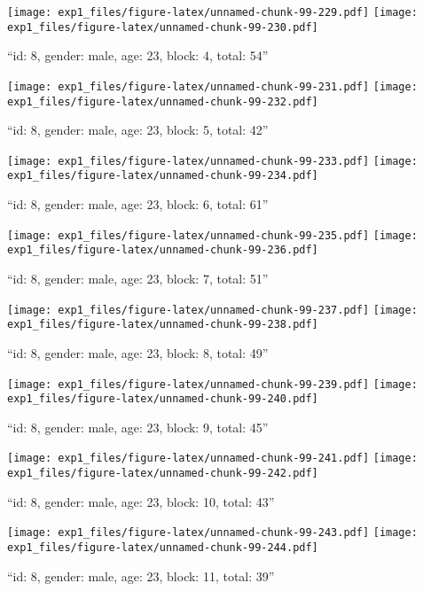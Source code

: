 \documentclass[,]{article}
\begin{document}
\texttt{[image: exp1\_files/figure-latex/unnamed-chunk-99-229.pdf]}
\texttt{[image: exp1\_files/figure-latex/unnamed-chunk-99-230.pdf]}

\newpage
[1] 

``id: 8, gender: male, age: 23, block: 4, total: 54''

\texttt{[image: exp1\_files/figure-latex/unnamed-chunk-99-231.pdf]}
\texttt{[image: exp1\_files/figure-latex/unnamed-chunk-99-232.pdf]}

\newpage
[1] 

``id: 8, gender: male, age: 23, block: 5, total: 42''

\texttt{[image: exp1\_files/figure-latex/unnamed-chunk-99-233.pdf]}
\texttt{[image: exp1\_files/figure-latex/unnamed-chunk-99-234.pdf]}

\newpage
[1] 

``id: 8, gender: male, age: 23, block: 6, total: 61''

\texttt{[image: exp1\_files/figure-latex/unnamed-chunk-99-235.pdf]}
\texttt{[image: exp1\_files/figure-latex/unnamed-chunk-99-236.pdf]}

\newpage
[1] 

``id: 8, gender: male, age: 23, block: 7, total: 51''

\texttt{[image: exp1\_files/figure-latex/unnamed-chunk-99-237.pdf]}
\texttt{[image: exp1\_files/figure-latex/unnamed-chunk-99-238.pdf]}

\newpage
[1] 

``id: 8, gender: male, age: 23, block: 8, total: 49''

\texttt{[image: exp1\_files/figure-latex/unnamed-chunk-99-239.pdf]}
\texttt{[image: exp1\_files/figure-latex/unnamed-chunk-99-240.pdf]}

\newpage
[1] 

``id: 8, gender: male, age: 23, block: 9, total: 45''

\texttt{[image: exp1\_files/figure-latex/unnamed-chunk-99-241.pdf]}
\texttt{[image: exp1\_files/figure-latex/unnamed-chunk-99-242.pdf]}

\newpage
[1] 

``id: 8, gender: male, age: 23, block: 10, total: 43''

\texttt{[image: exp1\_files/figure-latex/unnamed-chunk-99-243.pdf]}
\texttt{[image: exp1\_files/figure-latex/unnamed-chunk-99-244.pdf]}

\newpage
[1] 

``id: 8, gender: male, age: 23, block: 11, total: 39''
\end{document}
